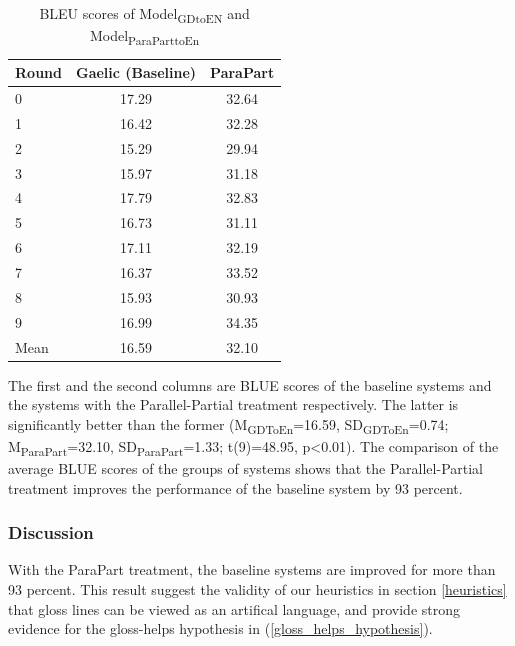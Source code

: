 \documentclass[final]{ua-thesis}
\numberwithin{equation}{section}
\begin{document}
\begin{table}[ht]
\centering
\begin{tabular}{lcc}
  \hline
Round & Gaelic (Baseline) & ParaPart \\ 
  \hline
0 & 17.29 & 32.64 \\ 
  1 & 16.42 & 32.28 \\ 
  2 & 15.29 & 29.94 \\ 
  3 & 15.97 & 31.18 \\ 
  4 & 17.79 & 32.83 \\ 
  5 & 16.73 & 31.11 \\ 
  6 & 17.11 & 32.19 \\ 
  7 & 16.37 & 33.52 \\ 
  8 & 15.93 & 30.93 \\ 
  9 & 16.99 & 34.35 \\ 
   \hline
Mean & 16.59 & 32.10 \\ 
   \hline
\end{tabular}
\caption{BLEU scores of Model\textsubscript{GDtoEN} and Model\textsubscript{ParaParttoEn}} 
\label{Table:ParaPart}
\end{table}
The first and the second columns are BLUE scores of the baseline systems and the systems with the Parallel-Partial treatment respectively. The latter is significantly better than the former
(M\textsubscript{GDToEn}=16.59, SD\textsubscript{GDToEn}=0.74; M\textsubscript{ParaPart}=32.10, SD\textsubscript{ParaPart}=1.33; t(9)=48.95, p<0.01).
The comparison of the average BLUE scores of the groups of systems shows that the Parallel-Partial treatment improves the performance of the baseline system by 93 percent.
\subsubsection{Discussion}
With the ParaPart treatment, the baseline systems are improved for more than 93 percent. This result suggest the validity of our heuristics in section \ref{heuristics} that gloss lines can be viewed as an artifical language, and provide strong evidence for the gloss-helps hypothesis in (\ref{gloss_helps_hypothesis}).     


\end{document}
